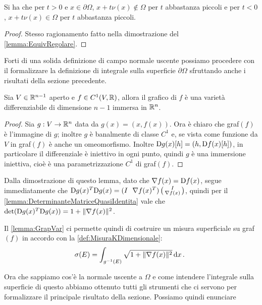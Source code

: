 \begin{remark}
	Si ha che per $t>0$ e $x\in\partial\Omega$, $x+t\nu(x)\notin \Omega$ per $t$ abbastanza piccoli e per $t<0$, $x+t\nu(x)\in \Omega$ per $t$
	abbastanza piccoli.
\end{remark}
\begin{proof}
	Stesso ragionamento fatto nella dimostrazione del \cref{lemma:EquivRegolare}.
\end{proof}

Forti di una solida definizione di campo normale uscente possiamo procedere con il formalizzare la definizione di integrale sulla superficie $\partial\Omega$ sfruttando anche i risultati della sezione precedente.

\begin{lemma}\label{lemma:GrapVar}
	Sia $V\in\mathbb R^{n-1}$ aperto e $f\in C^1(V,\mathbb R)$, allora il grafico di $f$ è una varietà differenziabile di dimensione $n-1$ immersa in $\mathbb R^n$.
\end{lemma}
\begin{proof}
	Sia $g:V\rightarrow \mathbb R^n$ data da $g(x)=(x,f(x))$. Ora è chiaro che graf$(f)$ è l'immagine di $g$; inoltre $g$ è banalmente di classe $C^1$
	e, se vista come funzione da $V$ in graf$(f)$ è anche un omeomorfismo. Inoltre $\mathrm D g(x)[h]=(h,\mathrm D f(x)[h])$, in particolare il differenziale è
	iniettivo in ogni punto, quindi $g$ è una immersione iniettiva, cioè è una parametrizzazione $C^1$ di graf$(f)$.
\end{proof}

\begin{remark}
	Dalla dimostrazione di questo lemma, dato che $\nabla f(x)=\mathrm D f(x)$, segue immediatamente che $\mathrm D g(x)^T \mathrm D g(x)=
	(I \ \ \nabla f(x)^T)
	\left(\begin{smallmatrix}
	I \\
	\nabla f(x)
	\end{smallmatrix}\right)$, quindi per il \cref{lemma:DeterminanteMatriceQuasiIdentita} vale che $\det (\mathrm D g(x)^T \mathrm D g(x)) = 1+\lVert\nabla f(x)\rVert^2$. 
\end{remark}

Il \cref{lemma:GrapVar} ci permette quindi di costruire un misura superficiale su graf$(f)$ in accordo con la \cref{def:MisuraKDimensionale}:
\begin{equation}\label{eq:MisuraSuperficialeGrafico}
	\sigma(E)=\int_{g^{-1}(E)} \sqrt{1+\lVert\nabla f(x)\rVert^2} \,\mathrm d x\, \text{. }
\end{equation}


Ora che sappiamo cos'è la normale uscente a $\Omega$ e come intendere l'integrale sulla superficie di questo
abbiamo ottenuto tutti gli strumenti che ci servono per formalizzare il principale risultato della sezione. Possiamo quindi enunciare 

